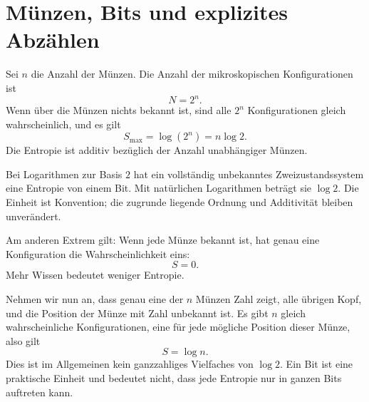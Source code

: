 \section{Münzen, Bits und explizites Abzählen}

Sei \(n\) die Anzahl der Münzen. Die Anzahl der mikroskopischen Konfigurationen ist
\begin{equation}
 N=2^n.
 \label{eq:sm1-coin-state-count}
\end{equation}
Wenn über die Münzen nichts bekannt ist, sind alle \(2^n\) Konfigurationen gleich
wahrscheinlich, und es gilt
\begin{equation}
 S_{\max}=\log(2^n)=n\log2.
 \label{eq:sm1-coin-max-entropy}
\end{equation}
Die Entropie ist additiv bezüglich der Anzahl unabhängiger Münzen.

Bei Logarithmen zur Basis \(2\) hat ein vollständig unbekanntes Zweizustandssystem
eine Entropie von einem Bit. Mit natürlichen Logarithmen beträgt sie \(\log2\). Die Einheit
ist Konvention; die zugrunde liegende Ordnung und Additivität bleiben unverändert.

Am anderen Extrem gilt: Wenn jede Münze bekannt ist, hat genau eine Konfiguration
die Wahrscheinlichkeit eins:
\begin{equation}
 S=0.
\end{equation}
Mehr Wissen bedeutet weniger Entropie.

Nehmen wir nun an, dass genau eine der \(n\) Münzen Zahl zeigt, alle übrigen Kopf,
und die Position der Münze mit Zahl unbekannt ist. Es gibt \(n\) gleich wahrscheinliche
Konfigurationen, eine für jede mögliche Position dieser Münze, also gilt
\begin{equation}
 S=\log n.
 \label{eq:sm1-one-tail-entropy}
\end{equation}
Dies ist im Allgemeinen kein ganzzahliges Vielfaches von \(\log2\). Ein Bit ist eine praktische
Einheit und bedeutet nicht, dass jede Entropie nur in ganzen Bits auftreten kann.

\begin{classroomqa}
\end{classroomqa}

